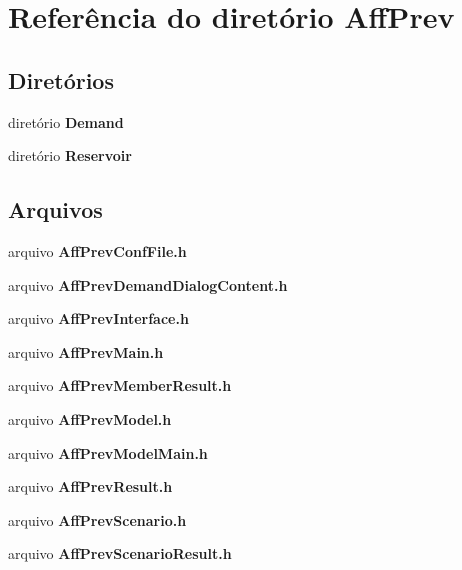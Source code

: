 \section{Referência do diretório Aff\+Prev}
\label{dir_ed8e7ad4368f111c2b08d67f3cf46d9e}
\subsection*{Diretórios}
\begin{DoxyCompactItemize}
\item 
diretório {\bf Demand}
\item 
diretório {\bf Reservoir}
\end{DoxyCompactItemize}
\subsection*{Arquivos}
\begin{DoxyCompactItemize}
\item 
arquivo {\bf Aff\+Prev\+Conf\+File.\+h}
\item 
arquivo {\bf Aff\+Prev\+Demand\+Dialog\+Content.\+h}
\item 
arquivo {\bf Aff\+Prev\+Interface.\+h}
\item 
arquivo {\bf Aff\+Prev\+Main.\+h}
\item 
arquivo {\bf Aff\+Prev\+Member\+Result.\+h}
\item 
arquivo {\bf Aff\+Prev\+Model.\+h}
\item 
arquivo {\bf Aff\+Prev\+Model\+Main.\+h}
\item 
arquivo {\bf Aff\+Prev\+Result.\+h}
\item 
arquivo {\bf Aff\+Prev\+Scenario.\+h}
\item 
arquivo {\bf Aff\+Prev\+Scenario\+Result.\+h}
\end{DoxyCompactItemize}
